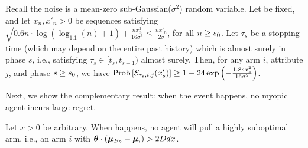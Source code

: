 \begin{lemma} \label{lem:round-prob}
Recall the noise is a mean-zero sub-Gaussian($\sigma^2$) random variable.
Let \LatePhase be fixed, 
and let $x_n, x'_n > 0$ be sequences satisfying 
$\sqrt{0.6 n \cdot \log (\log_{1.1}(n) + 1) + \frac{n x_n^2}{16 \sigma^2}}
\leq \frac{n x'_n}{2 \sigma}$,
for all $n \geq s_0$.
Let $\tau_s$ be a stopping time
(which may depend on the entire past history)
which is almost surely in phase $s$,
i.e., satisfying $\tau_s \in [t_s, t_{s+1})$ almost surely.
Then, for any arm $i$, attribute $j$, and phase $s \geq s_0$,
we have 
$\Prob{\AccE{\tau_s}{i}{j}{x'_s}}
\geq 1 - 24 \exp\left(-\frac{1.8 s x_s^2}{16 \sigma^2} \right)$.
\end{lemma}

Next, we show the complementary result:
when the event  happens, no myopic agent incurs large regret.

\begin{lemma} \label{lem:right-choice}
Let $x > 0$ be arbitrary.
When  happens,
no agent \AgV will pull a highly suboptimal arm, i.e., an arm $i$ with 
$\bm{\theta} \cdot (\bm{\mu}_{B_{\bm{\theta}}} - \bm{\mu}_{i}) > 2D d x$.
\end{lemma}


